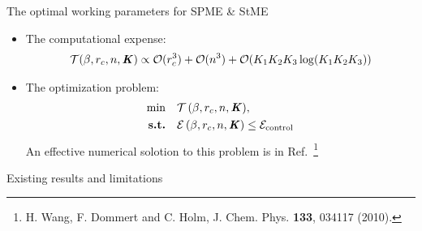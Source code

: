 \documentclass{beamer}
\newcommand{\redc}[1]{{\color{red} #1}}
\newcommand{\bluec}[1]{{\color{blue} #1}}
\newcommand{\vect}[1]{\textbf{\textit{#1}}}
\newcommand{\tickYes}{\checkmark}
\begin{document}
\begin{frame}{The optimal working parameters for SPME \& StME}
  \begin{itemize}
  \item <1-> The computational expense:
    \bluec{
      \begin{align*}
        \mathcal T ({\beta}, r_c, n, {\vect K})
        \propto
        \mathcal O(r_c^3) +
        \mathcal O(n^3) +
        \mathcal O(K_1K_2K_3\log(K_1K_2K_3))
      \end{align*}
    }
  \item <2->The optimization problem:
    \bluec{
      \begin{align*}
        \min & \quad\mathcal T\,({\beta}, r_c, n, {\vect K}),\\
        \textbf{s.t.} &
        \quad \mathcal E\,({\beta}, r_c, n, {\vect K}) \leq
        \mathcal E_{\textrm{control}}
      \end{align*}
    }
    An effective numerical solotion to this problem is in Ref.~\footnote{
    \bluec{H. Wang, F. Dommert and C. Holm, J. Chem. Phys. \textbf{133}, 034117 (2010).}}
  \end{itemize}
\end{frame}

\begin{frame}{Existing results and limitations}
\end{frame}
\end{document}
